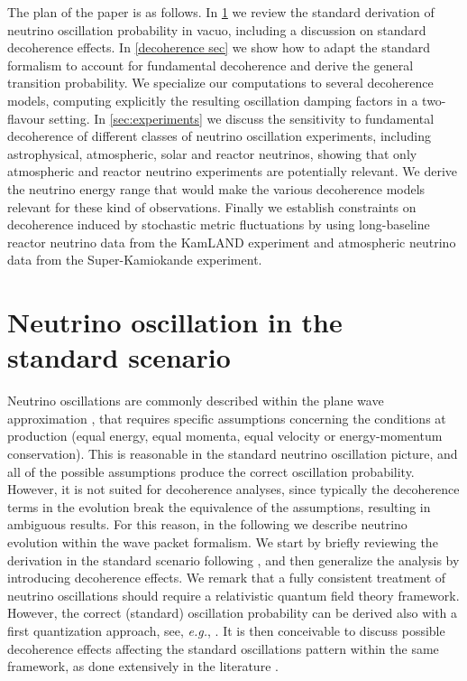 \documentclass[11pt]{article}
\begin{document}
The plan of the paper is as follows. In \cref{standard oscillations section} we review the standard derivation of neutrino oscillation probability in vacuo, including a discussion on standard decoherence effects. In \cref{decoherence sec} we show how to adapt the standard formalism to account for fundamental decoherence and derive the general transition probability. We specialize our computations to several decoherence models, computing explicitly the resulting oscillation damping factors in a two-flavour setting. In \cref{sec:experiments}
we discuss the sensitivity to fundamental decoherence of different classes of neutrino oscillation experiments, including astrophysical, atmospheric, solar and reactor neutrinos, showing that only atmospheric and reactor neutrino experiments are potentially relevant. We derive the neutrino energy range that would make the various decoherence models relevant for these kind of observations. Finally we establish constraints on decoherence induced by stochastic metric fluctuations by using long-baseline reactor neutrino data from the KamLAND experiment and atmospheric neutrino data from the Super-Kamiokande experiment.




\section{Neutrino oscillation in the standard scenario}\label{standard oscillations section}

Neutrino oscillations are commonly described within the plane wave approximation \cite{Akhmedov:2009rb}, that requires specific assumptions concerning the conditions at production (equal energy, equal momenta, equal velocity or energy-momentum conservation). This is reasonable in the standard neutrino oscillation picture, and all of the possible assumptions produce the correct oscillation probability. However, it is not suited for decoherence analyses, since typically the decoherence terms in the evolution break the equivalence of the assumptions, resulting in ambiguous results. For this reason, in the following we describe neutrino evolution within the wave packet formalism. We start by briefly reviewing the derivation in the standard scenario following \cite{Akhmedov:2009rb}, and then generalize the analysis by introducing decoherence effects. We remark that a fully consistent treatment of neutrino oscillations should require a relativistic quantum field theory framework. However, the correct (standard) oscillation probability can be derived also with a first quantization approach, see, \emph{e.g.}, \cite{Akhmedov:2009rb}. It is then conceivable to discuss possible decoherence effects affecting the standard oscillations pattern within the same framework, as done extensively in the literature \cite{Christian:2004xb,Banerjee:2022slh,Mavromatos:2007hv,Mavromatos:2004sz,Barenboim:2004wu,Christian:2005qa,Giunti:1997wq,DeRomeri:2023dht,Lisi:2000zt,Adler:2000vfa}.
\end{document}
